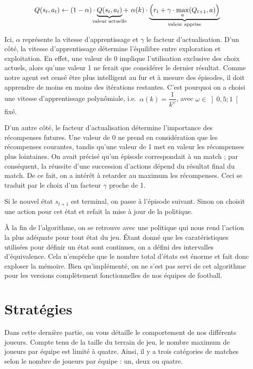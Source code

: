 \documentclass[12pt,a4paper]{article}
\begin{document}
\begin{equation*}
  Q(s_t,a_t) \gets (1-\alpha) \cdot 
  \underbrace{Q(s_t,a_t)}_{\mathclap{\text{valeur actuelle}}} + \ \alpha(k) 
\cdot \underbrace{\Big(r_t + \gamma \cdot \max_a(Q_{t+1},a) 
	\Big)}_{\mathclap{\text{valeur   apprise}}}
\end{equation*}

Ici, $\alpha$ repr\'esente la vitesse d'apprentissage et $\gamma$ le facteur 
d'actualisation. D'un c\^ot\'e, la vitesse d'apprentissage d\'etermine 
l'\'equilibre entre exploration et exploitation. En effet, une valeur de 
0 implique l'utilisation exclusive des choix actuels, alors qu'une 
valeur 1 ne ferait que consid\'erer le dernier r\'esultat.
Comme notre agent est cens\'e \^etre plus intelligent au fur et \`a mesure des 
\'episodes, il doit apprendre de moins en moins des it\'erations restantes. 
C'est pourquoi on a choisi une vitesse d'apprentissage polyn\^omiale, i.e.\ 
$\alpha(k)=\dfrac{1}{k^\omega}$, avec $\omega \in \left] 0,5;1 \right[$ fix\'e.

D'un autre c\^ot\'e, le facteur d'actualisation d\'etermine l'importance des 
r\'ecompenses futures. Une valeur de 0 ne prend en consid\'eration que les 
r\'ecompenses courantes, tandis qu'une valeur de 1 met en valeur les 
r\'ecompenses plus lointaines. On avait pr\'ecis\'e qu'un \'episode 
correspondait \`a un match ; par cons\'equent, la r\'eussite d'une succession 
d'actions d\'epend du r\'esultat final du match. De ce fait, on a int\'er\^et 
\`a retarder au maximum les r\'ecompenses. Ceci se traduit par le choix d'un 
facteur $\gamma$ proche de 1.

Si le nouvel \'etat $s_{t+1}$ est terminal, on passe \`a l'\'episode 
suivant. Sinon on choisit une action pour cet \'etat et refait la mise \`a jour 
de la politique.

\`A la fin de l'algorithme, on se retrouve avec une politique qui nous rend 
l'action la plus ad\'equate pour tout \'etat du jeu. \'Etant donn\'e que les 
carat\'eristiques utilis\'ees pour d\'efinir un \'etat sont continues, 
on a d\'efini des intervalles d'\'equivalence. Cela n'emp\^eche que le nombre 
total d'\'etats est \'enorme et fait donc exploser la m\'emoire. Bien 
qu'impl\'ement\'e, on ne s'est pas servi de cet algorithme pour les 
versions compl\`etement fonctionnelles de nos \'equipes de football. 

\newpage

\part{Strat\'egies}
Dans cette derni\`ere partie, on vous d\'etaille le comportement de nos 
diff\'erents joueurs.
Compte tenu de la taille du terrain de jeu, le nombre maximum de joueurs par 
\'equipe est limit\'e \`a quatre. 
Ainsi, il y a trois cat\'egories de matches 
selon le nombre de joueurs par \'equipe : un, deux ou quatre.
\end{document}
